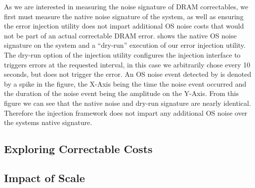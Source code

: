 As we are interested in measuring the noise signature of DRAM correctables, we
first must measure the native noise signature of the system, as well as ensuring
the error injection utility does not impart additional OS noise costs that would
not be part of an actual correctable DRAM error.   shows the
native OS noise signature on the \blake system and a ``dry-run'' execution of
our error injection utility.  The dry-run option of the injection utility
configures the injection interface to triggers errors at the requested interval,
in this case we arbitrarily chose every 10 seconds, but does not trigger the
error.  An OS noise event detected by \selfish is denoted by a spike in the
figure, the X-Axis being the time the noise event occurred and the duration of
the noise event being the amplitude on the Y-Axis.  From this figure we can see
that the native noise and dry-run signature are nearly identical.  Therefore the
injection framework does not impart any additional OS noise over the systems
native signature.  

\begin{figure*}
\caption{
}
\label{fig:DRAM_cost}
\end{figure*}


\subsection{Exploring Correctable Costs}


\subsection{Impact of Scale}

